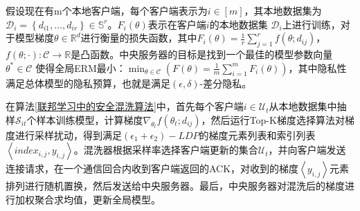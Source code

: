 假设现在有m个本地客户端，每个客户端表示为$i \in[m]$，其本地数据集为\\$\mathcal{D}_{i}=\left\{d_{i 1}, \ldots, d_{i r}\right\} \in \mathbb{S}^{r}$。$F_{i}(\theta)$表示在客户端$i$的本地数据集 $\mathcal{D}_{i}$上进行训练，对于模型梯度$\theta \in \mathbb{R}^{d}$进行衡量的损失函数，其中$F_{i}(\theta)=\frac{1}{r} \sum_{j=1}^{r} f\left(\theta ; d_{i j}\right)$，$f(\theta ; \cdot): \mathcal{C} \rightarrow \mathbb{R}$是凸函数。中央服务器的目标是找到一个最佳的模型参数向量$\theta^{*} \in \mathcal{C}$ 使得全局ERM最小：$\min _{\theta \in \mathcal{C}}\left(F(\theta)=\frac{1}{m} \sum_{i=1}^{m} F_{i}(\theta)\right)$，其中隐私性满足总体模型的隐私预算，也就是满足$(\epsilon, \delta)$-差分隐私。

在算法\ref{联邦学习中的安全混洗算法}中，首先每个客户端$i \in \mathcal{U}_{t}$从本地数据集中抽样$\mathcal{S}_{i t}$个样本训练模型，计算梯度$\nabla_{\theta_{t}} f\left(\theta_{t} ; d_{i j}\right)$，然后运行Top-K梯度选择算法对梯度进行采样扰动，得到满足$\left(\epsilon_{1}+\epsilon_{2}\right)-LDP$的梯度元素列表和索引列表$\left\langle index_{i,j}, y_{i,j}\right\rangle$。混洗器根据采样率选择客户端更新的集合$\mathcal{U}_{t}$，并向客户端发送连接请求，在一个通信回合内收到客户端返回的ACK，对收到的梯度$\left\langle y_{i,j} \right\rangle$元素排列进行随机置换，然后发送给中央服务器。最后，中央服务器对混洗后的梯度进行加权聚合求均值，更新全局模型。

